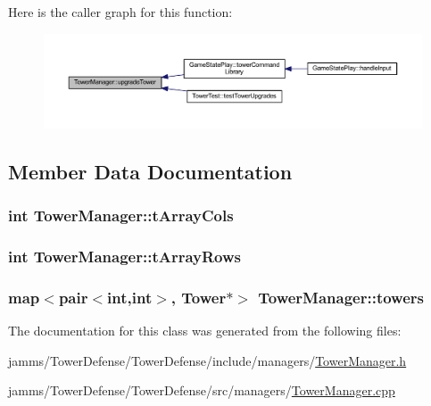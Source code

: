 Here is the caller graph for this function\+:
\nopagebreak
\begin{figure}[H]
\begin{center}
\leavevmode
\includegraphics[width=350pt]{class_tower_manager_aa74345499b531c211c0abf7b91eb96fc_icgraph}
\end{center}
\end{figure}




\subsection{Member Data Documentation}
\hypertarget{class_tower_manager_a5c5df568b2ea8dd7220fed1d850c4050}{
\subsubsection[{t\+Array\+Cols}]{\setlength{\rightskip}{0pt plus 5cm}int Tower\+Manager\+::t\+Array\+Cols}}\label{class_tower_manager_a5c5df568b2ea8dd7220fed1d850c4050}
\hypertarget{class_tower_manager_a11ff48fe3d8fbaaeb2b0380893c35990}{
\subsubsection[{t\+Array\+Rows}]{\setlength{\rightskip}{0pt plus 5cm}int Tower\+Manager\+::t\+Array\+Rows}}\label{class_tower_manager_a11ff48fe3d8fbaaeb2b0380893c35990}
\hypertarget{class_tower_manager_aff1fd2b7123af1d48255ee4dfe19c637}{
\subsubsection[{towers}]{\setlength{\rightskip}{0pt plus 5cm}map$<$pair$<$int,int$>$, {\bf Tower}$\ast$$>$ Tower\+Manager\+::towers\hspace{0.3cm}{\ttfamily [private]}}}\label{class_tower_manager_aff1fd2b7123af1d48255ee4dfe19c637}


The documentation for this class was generated from the following files\+:\begin{DoxyCompactItemize}
\item 
jamms/\+Tower\+Defense/\+Tower\+Defense/include/managers/\hyperlink{_tower_manager_8h}{Tower\+Manager.\+h}\item 
jamms/\+Tower\+Defense/\+Tower\+Defense/src/managers/\hyperlink{_tower_manager_8cpp}{Tower\+Manager.\+cpp}\end{DoxyCompactItemize}
